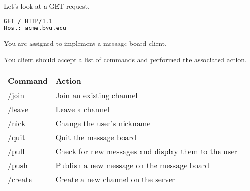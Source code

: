 Let's look at a GET request.
\begin{lstlisting}[language=HTML]
GET / HTTP/1.1
Host: acme.byu.edu
\end{lstlisting}

\begin{problem}
You are assigned to implement a message board client.

You client should accept a list of commands and performed the associated action.
\begin{table}[H]
\begin{tabular}{|l|l|}
\hline
Command & Action \\
\hline
/join & Join an existing channel \\
/leave & Leave a channel \\
/nick & Change the user's nickname \\
/quit & Quit the message board \\
/pull & Check for new messages and display them to the user\\
/push & Publish a new message on the message board \\
/create & Create a new channel on the server \\
\hline
\end{tabular}
\end{table}
\end{problem}
